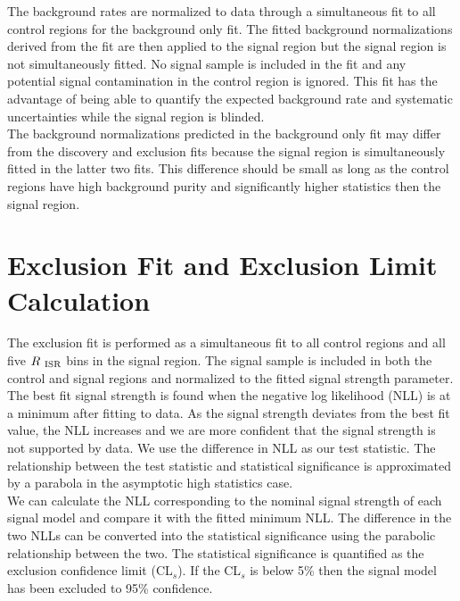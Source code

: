 \indent The background rates are normalized to data through a simultaneous fit to all control regions for the background only fit.  The fitted background normalizations derived from the fit are then applied to the signal region but the signal region is not simultaneously fitted.  No signal sample is included in the fit and any potential signal contamination in the control region is ignored.  This fit has the advantage of being able to quantify the expected background rate and systematic uncertainties while the signal region is blinded. \\


\indent The background normalizations predicted in the background only fit may differ from the discovery and exclusion fits because the signal region is simultaneously fitted in the latter two fits. This difference should be small as long as the control regions have high background purity and significantly higher statistics then the signal region.  \\

\section{Exclusion Fit and Exclusion Limit Calculation}
\label{sec:stat:limit}

\indent The exclusion fit is performed as a simultaneous fit to all control regions and all five $R_{~\mathrm{ISR}}$ bins in the signal region. The signal sample is included in both the control and signal regions and normalized to the fitted signal strength parameter.   \\

\indent The best fit signal strength is found when the negative log likelihood (NLL) is at a minimum after fitting to data.  As the signal strength deviates from the best fit value, the NLL increases and we are more confident that the signal strength is not supported by data.  We use the difference in NLL as our test statistic.  The relationship between the test statistic and statistical significance is approximated by a parabola in the asymptotic high statistics case. \\

\indent We can calculate the NLL corresponding to the nominal signal strength of each signal model and compare it with the fitted minimum NLL.  The difference in the two NLLs can be converted into the statistical significance using the parabolic relationship between the two.  The statistical significance is quantified as the exclusion confidence limit (CL$_s$).  If the CL$_s$ is below 5\% then the signal model has been excluded to 95\% confidence. \\

